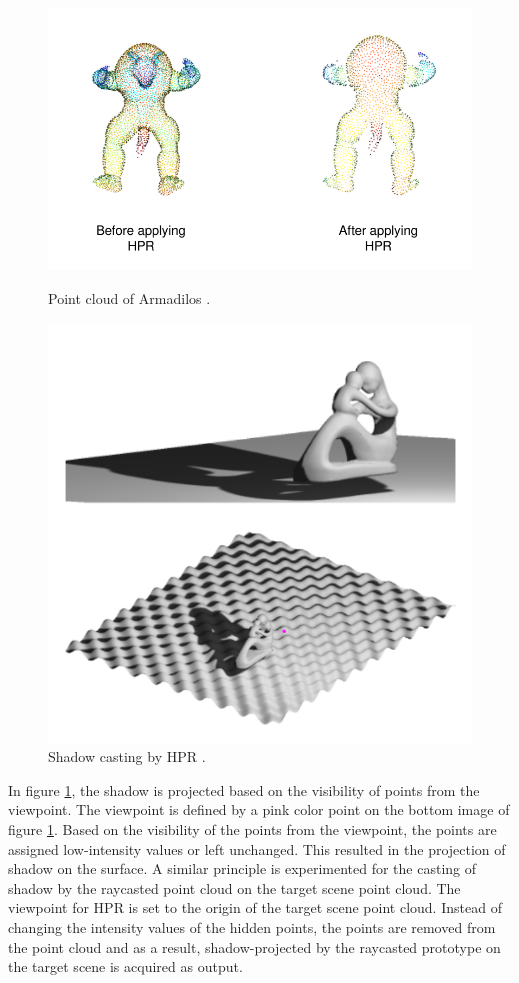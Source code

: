 \begin{figure}[htbp]
    \centering
    \begin{minipage}[b]{0.45\textwidth}
    \centering
    \includegraphics[width=0.5\linewidth]{97_graphics/concepts/shadowcasting_from_paper.pdf}
    \caption{Point cloud of Armadilos \parencite{open3d}.}
    \label{fig:shadow_casting}
    \end{minipage}
    \hfill
    \begin{minipage}[b]{0.45\textwidth}
    \centering
    \includegraphics[width=0.5\linewidth]{97_graphics/concepts/hpr_reference_output.pdf}
    \caption{Shadow casting by HPR \parencite{katz2007}.}
    \label{fig:hpr_reference_output}
    \end{minipage}
\end{figure}

In figure \ref{fig:hpr_reference_output}, the shadow is projected based on the visibility of points from the viewpoint. The viewpoint is defined by a pink color point on the bottom image of figure \ref{fig:hpr_reference_output}. Based on the visibility of the points from the viewpoint, the points are assigned low-intensity values or left unchanged. This resulted in the projection of shadow on the surface.
A similar principle is experimented for the casting of shadow by the raycasted point cloud on the target scene point cloud. The viewpoint for HPR is set to the origin of the target scene point cloud. Instead of changing the intensity values of the hidden points, the points are removed from the point cloud and as a result, shadow-projected by the raycasted prototype on the target scene is acquired as output. 

